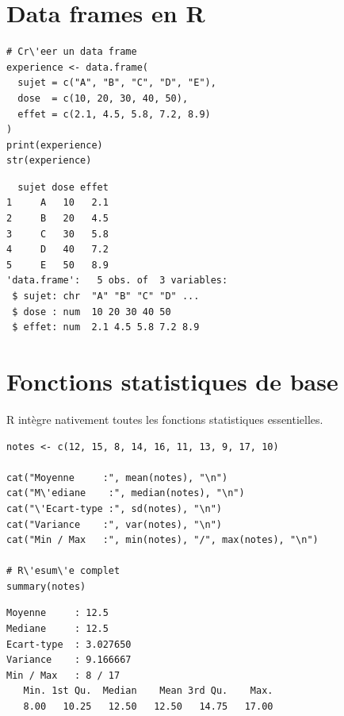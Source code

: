 \section{Data frames en R}

\begin{codeblock}[title=\textbf{R}]
\begin{verbatim}
# Cr\'eer un data frame
experience <- data.frame(
  sujet = c("A", "B", "C", "D", "E"),
  dose  = c(10, 20, 30, 40, 50),
  effet = c(2.1, 4.5, 5.8, 7.2, 8.9)
)
print(experience)
str(experience)
\end{verbatim}
\end{codeblock}

\begin{codeoutput}
\begin{verbatim}
  sujet dose effet
1     A   10   2.1
2     B   20   4.5
3     C   30   5.8
4     D   40   7.2
5     E   50   8.9
'data.frame':	5 obs. of  3 variables:
 $ sujet: chr  "A" "B" "C" "D" ...
 $ dose : num  10 20 30 40 50
 $ effet: num  2.1 4.5 5.8 7.2 8.9
\end{verbatim}
\end{codeoutput}

\section{Fonctions statistiques de base}

R int\`egre nativement toutes les fonctions statistiques essentielles.

\begin{codeblock}[title=\textbf{R}]
\begin{verbatim}
notes <- c(12, 15, 8, 14, 16, 11, 13, 9, 17, 10)

cat("Moyenne     :", mean(notes), "\n")
cat("M\'ediane    :", median(notes), "\n")
cat("\'Ecart-type :", sd(notes), "\n")
cat("Variance    :", var(notes), "\n")
cat("Min / Max   :", min(notes), "/", max(notes), "\n")

# R\'esum\'e complet
summary(notes)
\end{verbatim}
\end{codeblock}

\begin{codeoutput}
\begin{verbatim}
Moyenne     : 12.5
Mediane     : 12.5
Ecart-type  : 3.027650
Variance    : 9.166667
Min / Max   : 8 / 17
   Min. 1st Qu.  Median    Mean 3rd Qu.    Max.
   8.00   10.25   12.50   12.50   14.75   17.00
\end{verbatim}
\end{codeoutput}

